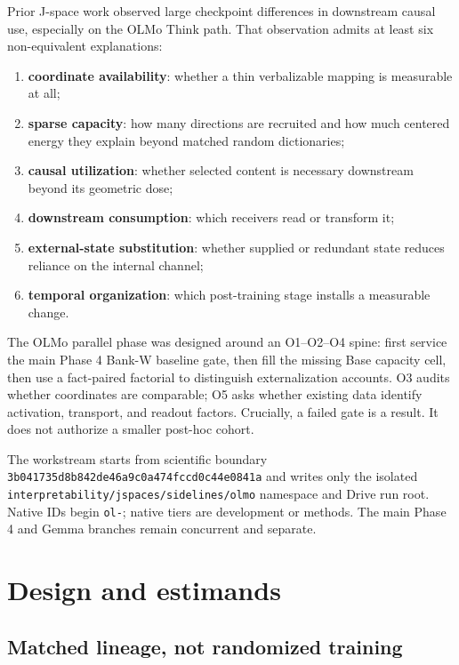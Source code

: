 \documentclass[11pt]{article}
\begin{document}
Prior J-space work observed large checkpoint differences in downstream causal
use, especially on the OLMo Think path. That observation admits at least six
non-equivalent explanations:

\begin{enumerate}
  \item \textbf{coordinate availability}: whether a thin verbalizable mapping
    is measurable at all;
  \item \textbf{sparse capacity}: how many directions are recruited and how
    much centered energy they explain beyond matched random dictionaries;
  \item \textbf{causal utilization}: whether selected content is necessary
    downstream beyond its geometric dose;
  \item \textbf{downstream consumption}: which receivers read or transform it;
  \item \textbf{external-state substitution}: whether supplied or redundant
    state reduces reliance on the internal channel;
  \item \textbf{temporal organization}: which post-training stage installs a
    measurable change.
\end{enumerate}

The OLMo parallel phase was designed around an O1--O2--O4 spine: first service
the main Phase 4 Bank-W baseline gate, then fill the missing Base capacity
cell, then use a fact-paired factorial to distinguish externalization accounts.
O3 audits whether coordinates are comparable; O5 asks whether existing data
identify activation, transport, and readout factors. Crucially, a failed gate
is a result. It does not authorize a smaller post-hoc cohort.

\begin{statusbox}
The workstream starts from scientific boundary
\texttt{3b041735d8b842de46a9c0a474fccd0c44e0841a} and writes only the isolated
\nolinkurl{interpretability/jspaces/sidelines/olmo} namespace and Drive run root.
Native IDs begin \texttt{ol-}; native tiers are development or methods. The
main Phase 4 and Gemma branches remain concurrent and separate.
\end{statusbox}

\section{Design and estimands}

\subsection{Matched lineage, not randomized training}
\end{document}
